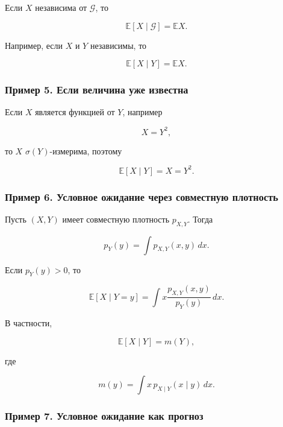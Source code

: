 \documentclass[
  11pt,
  a4paper,
]{article}
\begin{document}
Если \(X\) независима от \(\mathcal G\), то

\[
\mathbb E[X\mid\mathcal G]=\mathbb EX.
\]

Например, если \(X\) и \(Y\) независимы, то

\[
\mathbb E[X\mid Y]=\mathbb EX.
\]

\subsubsection{Пример 5. Если величина уже
известна}\label{ux43fux440ux438ux43cux435ux440-5.-ux435ux441ux43bux438-ux432ux435ux43bux438ux447ux438ux43dux430-ux443ux436ux435-ux438ux437ux432ux435ux441ux442ux43dux430}

Если \(X\) является функцией от \(Y\), например

\[
X=Y^2,
\]

то \(X\) \(\sigma(Y)\)-измерима, поэтому

\[
\mathbb E[X\mid Y]=X=Y^2.
\]

\subsubsection{Пример 6. Условное ожидание через совместную
плотность}\label{ux43fux440ux438ux43cux435ux440-6.-ux443ux441ux43bux43eux432ux43dux43eux435-ux43eux436ux438ux434ux430ux43dux438ux435-ux447ux435ux440ux435ux437-ux441ux43eux432ux43cux435ux441ux442ux43dux443ux44e-ux43fux43bux43eux442ux43dux43eux441ux442ux44c}

Пусть \((X,Y)\) имеет совместную плотность \(p_{X,Y}\). Тогда

\[
p_Y(y)=\int p_{X,Y}(x,y)\,dx.
\]

Если \(p_Y(y)>0\), то

\[
\mathbb E[X\mid Y=y]
=
\int x\frac{p_{X,Y}(x,y)}{p_Y(y)}\,dx.
\]

В частности,

\[
\mathbb E[X\mid Y]=m(Y),
\]

где

\[
m(y)=\int x\,p_{X\mid Y}(x\mid y)\,dx.
\]

\subsubsection{Пример 7. Условное ожидание как
прогноз}\label{ux43fux440ux438ux43cux435ux440-7.-ux443ux441ux43bux43eux432ux43dux43eux435-ux43eux436ux438ux434ux430ux43dux438ux435-ux43aux430ux43a-ux43fux440ux43eux433ux43dux43eux437}
\end{document}
